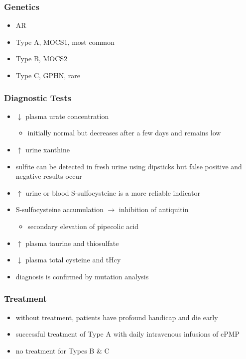 \documentclass{scrartcl}
\begin{document}
\subsubsection{Genetics}
\label{sec:org1dd3a30}
\begin{itemize}
\item AR
\item Type A, MOCS1, most common
\item Type B, MOCS2
\item Type C, GPHN, rare
\end{itemize}

\subsubsection{Diagnostic Tests}
\label{sec:org7153e90}
\begin{itemize}
\item \(\downarrow\) plasma urate concentration
\begin{itemize}
\item initially normal but decreases after a few days and remains low
\end{itemize}
\item \(\uparrow\) urine xanthine
\item sulfite can be detected in fresh urine using dipsticks but false
positive and negative results occur
\item \(\uparrow\) urine or blood S-sulfocysteine is a more reliable indicator
\item S-sulfocysteine accumulation \(\to\) inhibition of antiquitin
\begin{itemize}
\item secondary elevation of pipecolic acid
\end{itemize}
\item \(\uparrow\) plasma taurine and thiosulfate
\item \(\downarrow\) plasma total cysteine and tHcy
\item diagnosis is confirmed by mutation analysis
\end{itemize}

\subsubsection{Treatment}
\label{sec:org35cac82}
\begin{itemize}
\item without treatment, patients have profound handicap and die early
\item successful treatment of Type A with daily intravenous infusions of
cPMP
\item no treatment for Types B \& C
\end{itemize}
\end{document}
